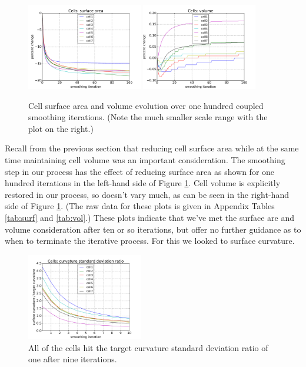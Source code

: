 \documentclass[a4paper,10pt]{article}
\begin{document}
\begin{figure}[H]
\begin{center}
\includegraphics[width=0.45\textwidth]{images/cell_surf_100.pdf}
\includegraphics[width=0.45\textwidth]{images/cell_vol_100.pdf}
\end{center}
\caption{Cell surface area and volume evolution over one hundred coupled smoothing iterations. (Note the much smaller scale range with the plot on the right.)}
\label{fig:100_iterations}
\end{figure}

Recall from the previous section that reducing cell surface area while at the same time maintaining cell volume was an important consideration. The smoothing step in our process has the effect of reducing surface area as shown for one hundred iterations in the left-hand side of Figure \ref{fig:100_iterations}. Cell volume is explicitly restored in our process, so doesn't vary much, as can be seen in the right-hand side of Figure \ref{fig:100_iterations}. (The raw data for these plots is given in Appendix Tables \ref{tab:surf} and \ref{tab:vol}.) These plots indicate that we've met the surface are and volume consideration after ten or so iterations, but offer no further guidance as to when to terminate the iterative process. For this we looked to surface curvature.\\

\begin{figure}[H]
\begin{center}
\includegraphics[width=0.45\textwidth]{images/cell_curv_std.pdf}
\end{center}
\caption{All of the cells hit the target curvature standard deviation ratio of one after nine iterations.}
\label{fig:curv_std}
\end{figure}
\end{document}
